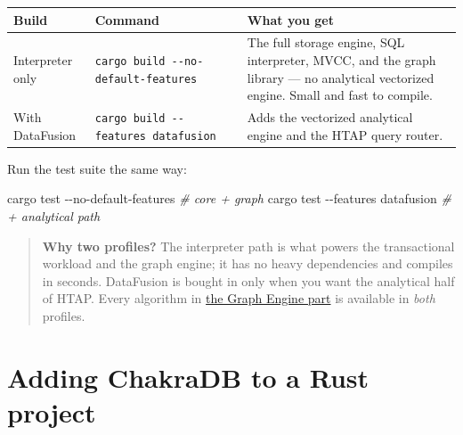 \documentclass[
  11pt,
  openany]{book}
\newenvironment{Shaded}{}{}
\newcommand{\AttributeTok}[1]{\textcolor[rgb]{0.49,0.56,0.16}{#1}}
\newcommand{\CommentTok}[1]{\textcolor[rgb]{0.38,0.63,0.69}{\textit{#1}}}
\newcommand{\ExtensionTok}[1]{#1}
\newcommand{\NormalTok}[1]{#1}
\begin{document}
\begin{longtable}[]{@{}
  >{\raggedright\arraybackslash}p{}
  >{\raggedright\arraybackslash}p{}
  >{\raggedright\arraybackslash}p{}@{}}
\toprule\noalign{}
\begin{minipage}[b]{\linewidth}\raggedright
Build
\end{minipage} & \begin{minipage}[b]{\linewidth}\raggedright
Command
\end{minipage} & \begin{minipage}[b]{\linewidth}\raggedright
What you get
\end{minipage} \\
\midrule\noalign{}
\endhead
\bottomrule\noalign{}
\endlastfoot
Interpreter only & \texttt{cargo\ build\ -\/-no-default-features} & The
full storage engine, SQL interpreter, MVCC, and the graph library --- no
analytical vectorized engine. Small and fast to compile. \\
With DataFusion & \texttt{cargo\ build\ -\/-features\ datafusion} & Adds
the vectorized analytical engine and the HTAP query router. \\
\end{longtable}

Run the test suite the same way:

\begin{Shaded}
\begin{Highlighting}[]
\ExtensionTok{cargo}\NormalTok{ test }\AttributeTok{{-}{-}no{-}default{-}features}          \CommentTok{\# core + graph}
\ExtensionTok{cargo}\NormalTok{ test }\AttributeTok{{-}{-}features}\NormalTok{ datafusion          }\CommentTok{\# + analytical path}
\end{Highlighting}
\end{Shaded}

\begin{quote}
\textbf{Why two profiles?} The interpreter path is what powers the
transactional workload and the graph engine; it has no heavy
dependencies and compiles in seconds. DataFusion is bought in only when
you want the analytical half of HTAP. Every algorithm in
\href{../graph/model.md}{the Graph Engine part} is available in
\emph{both} profiles.
\end{quote}

\section{Adding ChakraDB to a Rust
project}\label{adding-chakradb-to-a-rust-project}
\end{document}
